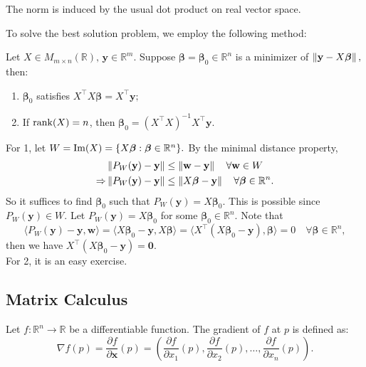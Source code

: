 \documentclass[12pt]{article}
\begin{document}
\begin{remark}
    The norm is induced by the usual dot product on real vector space.
\end{remark}

To solve the best solution problem, we employ the following method:
\begin{theorem}
    Let $X\in M_{m\times n}(\mathbb{R}),\, \mathbf{y}\in\mathbb{R}^m.$ Suppose $\boldsymbol{\beta}=\boldsymbol{\beta}_0\in\mathbb{R}^n$ is a minimizer of $\left\lVert \mathbf{y}-X\boldsymbol{\beta} \right\rVert,$ then:
    \begin{enumerate}
        \item $\boldsymbol{\beta}_0$ satisfies $X^\top X\boldsymbol{\beta}=X^\top \mathbf{y};$
        \item If $\operatorname{rank}(X)=n$, then $\boldsymbol{\beta}_0=(X^\top X)^{-1}X^\top \mathbf{y}.$
    \end{enumerate}
\label{least square}
\end{theorem}

\begin{pfbox}
    For 1, let $W=\operatorname{Im}(X)=\{X\boldsymbol{\beta}:\boldsymbol{\beta}\in\mathbb{R}^n\}.$
    By the minimal distance property, 
    \begin{align*}
                &\left\lVert P_W(\mathbf{y})-\mathbf{y} \right\rVert\le\left\lVert \mathbf{w}-\mathbf{y} \right\rVert\quad\forall \mathbf{w}\in W\\
     \Rightarrow &\left\lVert P_W(\mathbf{y})-\mathbf{y} \right\rVert\le\left\lVert X\boldsymbol{\beta}-\mathbf{y} \right\rVert\quad\forall \boldsymbol{\beta}\in\mathbb{R}^n.
    \end{align*}
    So it suffices to find $\boldsymbol{\beta}_0$ such that $P_W(\mathbf{y})=X\boldsymbol{\beta}_0.$
    This is possible since $P_W(\mathbf{y})\in W.$
    Let $P_W(\mathbf{y})=X\boldsymbol{\beta}_0$ for some $\boldsymbol{\beta}_0\in\mathbb{R}^n.$
    Note that $$\langle P_W(\mathbf{y})-\mathbf{y}, \mathbf{w}\rangle = \langle X\boldsymbol{\beta}_0-\mathbf{y}, X\boldsymbol{\beta}\rangle = \langle X^\top (X\boldsymbol{\beta}_0-\mathbf{y}), \boldsymbol{\beta}\rangle=0\quad\forall \boldsymbol{\beta}\in\mathbb{R}^n,$$
    then we have $X^\top (X\boldsymbol{\beta}_0-\mathbf{y})=\mathbf{0}.$\\

    For 2, it is an easy exercise.
\end{pfbox}

\subsection{Matrix Calculus}
\begin{definition}[Gradient]
Let $f: \mathbb{R}^n \to \mathbb{R}$ be a differentiable function. The gradient of $f$ at $p$ is defined as:
$$ \nabla f(p) = \frac{\partial f}{\partial \mathbf{x}}(p) = \left( \frac{\partial f}{\partial x_1}(p), \frac{\partial f}{\partial x_2}(p), \dots, \frac{\partial f}{\partial x_n}(p) \right).$$
\end{definition} 
\end{document}

